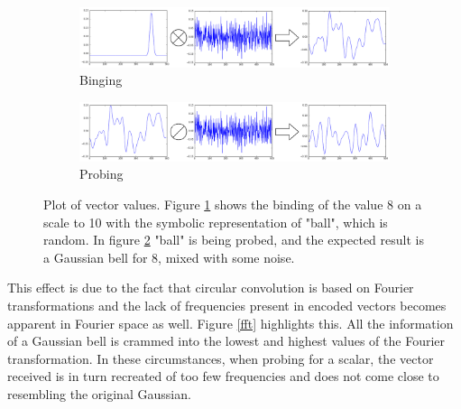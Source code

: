 \documentclass[conference]{IEEEtran}
\begin{document}
\begin{figure}
\begin{subfigure}{1\columnwidth}
\includegraphics[width=\columnwidth]{img/scalar-pre-perm.png}
\caption{Binging}
\label{no-perm-a}
\end{subfigure}
\begin{subfigure}{1\columnwidth}
\includegraphics[width=\columnwidth]{img/scalar-pre-perm-probe.png}
\caption{Probing}
\label{no-perm-b}
\end{subfigure}
\caption{Plot of vector values. Figure \ref{no-perm-a} shows the binding of the value 8 on a scale to 10 with the symbolic representation of "ball", which is random. In figure \ref{no-perm-b} "ball" is being probed, and the expected result is a Gaussian bell for 8, mixed with some noise.}
\label{no-perm}
\end{figure}

This effect is due to the fact that circular convolution is based on Fourier transformations and the lack of frequencies present in encoded vectors becomes apparent in Fourier space as well. Figure \ref{fft} highlights this. All the information of a Gaussian bell is crammed into the lowest and highest values of the Fourier transformation. In these circumstances, when probing for a scalar, the vector received is in turn recreated of too few frequencies and does not come close to resembling the original Gaussian. 
\end{document}
